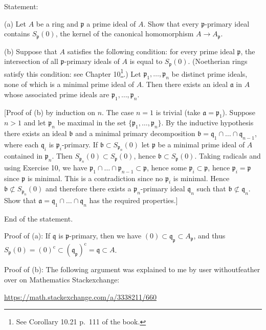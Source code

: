 \documentclass[parskip=half,fontsize=12pt]{scrartcl}%
\newcommand{\oo}{\operatorname}\newcommand{\ooo}{\operatorname*}
\newcommand{\mf}{\mathfrak}
\newcommand{\ppp}{\mf p}
\newcommand{\qqq}{\mf q}
\begin{document}
Statement:

(a) Let $A$ be a ring and $\mathfrak p$ a prime ideal of $A$. Show that every $\mathfrak p$-primary ideal contains $S_{\mathfrak p}(0)$, the kernel of the canonical homomorphism $A\to A_{\mathfrak p}$.

(b) Suppose that $A$ satisfies the following condition: for every prime ideal $\mathfrak p$, the intersection of all $\mathfrak p$-primary ideals of $A$ is equal to $S_{\mathfrak p}(0)$. (Noetherian rings satisfy this condition: see Chapter 10\footnote{See Corollary 10.21 p.~111 of the book.}.) Let $\mathfrak p_1,\dots,\mathfrak p_n$ be distinct prime ideals, none of which is a minimal prime ideal of $A$. Then there exists an ideal $\mathfrak a$ in $A$ whose associated prime ideals are $\mathfrak p_1,\dots,\mathfrak p_n$.

[Proof of (b) by induction on $n$. The case $n=1$ is trivial (take $\mathfrak a=\mathfrak p_1$). Suppose $n>1$ and let $\mathfrak p_n$ be maximal in the set $\{\mathfrak p_1,\dots,\mathfrak p_n\}$. By the inductive hypothesis there exists an ideal $\mathfrak b$ and a minimal primary decomposition $\mathfrak b=\mathfrak q_1\cap\dots\cap\mathfrak q_{n-1}$, where each $\mathfrak q_i$ is $\mathfrak p_i$-primary. If $\mathfrak b\subset S_{\mathfrak p_n}(0)$ let $\mathfrak p$ be a minimal prime ideal of $A$ contained in $\mathfrak p_n$. Then $S_{\mathfrak p_n}(0)\subset S_{\mathfrak p}(0)$, hence $\mathfrak b\subset S_{\mathfrak p}(0)$. Taking radicals and using Exercise 10, we have $\mathfrak p_1\cap\dots\cap\mathfrak p_{n-1}\subset\mathfrak p$, hence some $\mathfrak p_i\subset \mathfrak p$, hence $\mathfrak p_i=\mathfrak p$ since $\mathfrak p$ is minimal. This is a contradiction since no $\mathfrak p_i$ is minimal. Hence $\mathfrak b\not\subset S_{\mathfrak p_n}(0)$ and therefore there exists a $\mathfrak p_n$-primary ideal $\mathfrak q_n$ such that $\mathfrak b\not\subset\mathfrak q_n$. Show that $\mathfrak a=\mathfrak q_1\cap\dots\cap\mathfrak q_n$ has the required properties.]

End of the statement.

Proof of (a): If $\qqq$ is $\ppp$-primary, then we have $(0)\subset\qqq_\ppp\subset A_\ppp$, and thus $S_\ppp(0)=(0)^{\oo c}\subset(\qqq_\ppp)^{\oo c}=\qqq\subset A$. 

Proof of (b): The following argument was explained to me by user withoutfeather over on Mathematics Stackexchange: 

\href{https://math.stackexchange.com/a/3338211/660}{https://math.stackexchange.com/a/3338211/660}
\end{document}
